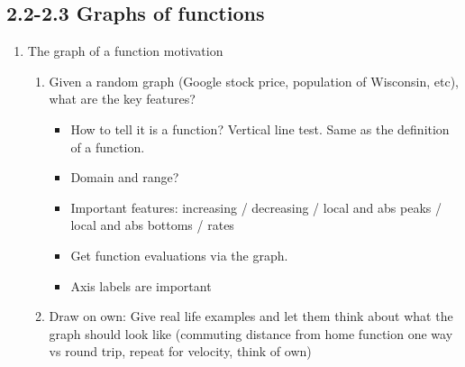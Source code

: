 \documentclass{article}
\begin{document}
\subsection{2.2-2.3 Graphs of functions}

\begin{enumerate}

\item The graph of a function motivation
\begin{enumerate}
\item Given a random graph (Google stock price, population of Wisconsin, etc), what are the key features?
\begin{itemize}
\item How to tell it is a function? Vertical line test. Same as the definition of a function.
\item Domain and range?
\item Important features: increasing / decreasing / local and abs peaks / local and abs bottoms / rates
\item Get function evaluations via the graph.
\item Axis labels are important
\end{itemize}
\item Draw on own: Give real life examples and let them think about what the graph should look like (commuting distance from home function one way vs round trip, repeat for velocity, think of own)
\end{enumerate}


\end{enumerate}
\end{document}

